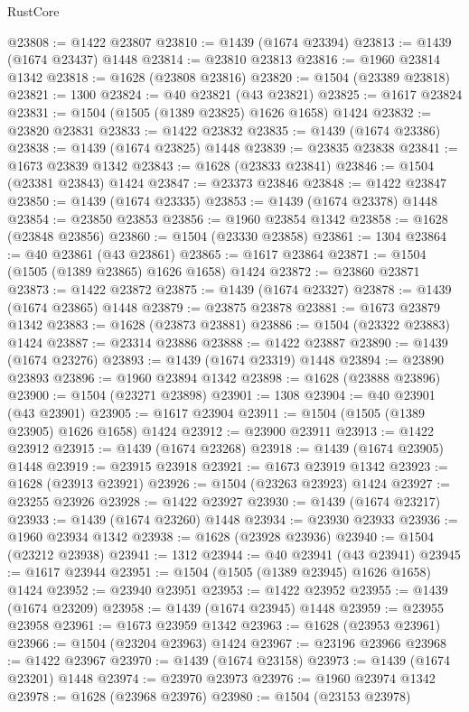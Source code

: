 \begin{lexlean}{RustCore}
\begin{coremodule}
@23808 := @1422 @23807
@23810 := @1439 (@1674 @23394)
@23813 := @1439 (@1674 @23437) @1448
@23814 := @23810 @23813
@23816 := @1960 @23814 @1342
@23818 := @1628 (@23808 @23816)
@23820 := @1504 (@23389 @23818)
@23821 := 1300
@23824 := @40 @23821 (@43 @23821)
@23825 := @1617 @23824
@23831 := @1504 (@1505 (@1389 @23825) @1626 @1658) @1424
@23832 := @23820 @23831
@23833 := @1422 @23832
@23835 := @1439 (@1674 @23386)
@23838 := @1439 (@1674 @23825) @1448
@23839 := @23835 @23838
@23841 := @1673 @23839 @1342
@23843 := @1628 (@23833 @23841)
@23846 := @1504 (@23381 @23843) @1424
@23847 := @23373 @23846
@23848 := @1422 @23847
@23850 := @1439 (@1674 @23335)
@23853 := @1439 (@1674 @23378) @1448
@23854 := @23850 @23853
@23856 := @1960 @23854 @1342
@23858 := @1628 (@23848 @23856)
@23860 := @1504 (@23330 @23858)
@23861 := 1304
@23864 := @40 @23861 (@43 @23861)
@23865 := @1617 @23864
@23871 := @1504 (@1505 (@1389 @23865) @1626 @1658) @1424
@23872 := @23860 @23871
@23873 := @1422 @23872
@23875 := @1439 (@1674 @23327)
@23878 := @1439 (@1674 @23865) @1448
@23879 := @23875 @23878
@23881 := @1673 @23879 @1342
@23883 := @1628 (@23873 @23881)
@23886 := @1504 (@23322 @23883) @1424
@23887 := @23314 @23886
@23888 := @1422 @23887
@23890 := @1439 (@1674 @23276)
@23893 := @1439 (@1674 @23319) @1448
@23894 := @23890 @23893
@23896 := @1960 @23894 @1342
@23898 := @1628 (@23888 @23896)
@23900 := @1504 (@23271 @23898)
@23901 := 1308
@23904 := @40 @23901 (@43 @23901)
@23905 := @1617 @23904
@23911 := @1504 (@1505 (@1389 @23905) @1626 @1658) @1424
@23912 := @23900 @23911
@23913 := @1422 @23912
@23915 := @1439 (@1674 @23268)
@23918 := @1439 (@1674 @23905) @1448
@23919 := @23915 @23918
@23921 := @1673 @23919 @1342
@23923 := @1628 (@23913 @23921)
@23926 := @1504 (@23263 @23923) @1424
@23927 := @23255 @23926
@23928 := @1422 @23927
@23930 := @1439 (@1674 @23217)
@23933 := @1439 (@1674 @23260) @1448
@23934 := @23930 @23933
@23936 := @1960 @23934 @1342
@23938 := @1628 (@23928 @23936)
@23940 := @1504 (@23212 @23938)
@23941 := 1312
@23944 := @40 @23941 (@43 @23941)
@23945 := @1617 @23944
@23951 := @1504 (@1505 (@1389 @23945) @1626 @1658) @1424
@23952 := @23940 @23951
@23953 := @1422 @23952
@23955 := @1439 (@1674 @23209)
@23958 := @1439 (@1674 @23945) @1448
@23959 := @23955 @23958
@23961 := @1673 @23959 @1342
@23963 := @1628 (@23953 @23961)
@23966 := @1504 (@23204 @23963) @1424
@23967 := @23196 @23966
@23968 := @1422 @23967
@23970 := @1439 (@1674 @23158)
@23973 := @1439 (@1674 @23201) @1448
@23974 := @23970 @23973
@23976 := @1960 @23974 @1342
@23978 := @1628 (@23968 @23976)
@23980 := @1504 (@23153 @23978)

\end{coremodule}
\end{lexlean}
